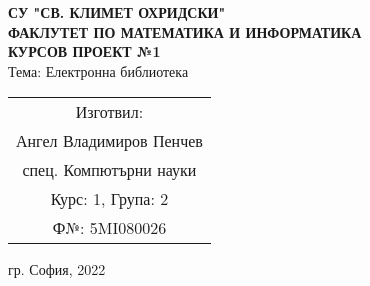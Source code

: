 \begin{center}
    \textbf{СУ "СВ. КЛИМЕТ ОХРИДСКИ"\\[0.2cm]}
    \textbf{ФАКЛУТЕТ ПО МАТЕМАТИКА И ИНФОРМАТИКА\\[6cm]}
    \textbf{\LARGE КУРСОВ ПРОЕКТ №1\\[4cm]}
    Тема: Електронна библиотека\\[4cm]

    \begin{minipage}[t]{0.35\textwidth}
        \begin{tabular}{@{}c@{}}
            \large {Изготвил:}      \\
            Ангел Владимиров Пенчев \\
            спец. Компютърни науки \\
            Курс: 1, Група: 2 \\
            Ф№: 5MI080026 \\
        \end{tabular}
    \end{minipage}

    \vfill

    {\large гр. София, 2022}
\end{center}